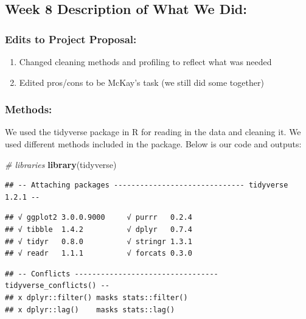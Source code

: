 \documentclass[]{article}
\newenvironment{Shaded}{\begin{snugshade}}{\end{snugshade}}
\newcommand{\CommentTok}[1]{\textcolor[rgb]{0.56,0.35,0.01}{\textit{#1}}}
\newcommand{\KeywordTok}[1]{\textcolor[rgb]{0.13,0.29,0.53}{\textbf{#1}}}
\newcommand{\NormalTok}[1]{#1}
\providecommand{\tightlist}{%
  \setlength{\itemsep}{0pt}\setlength{\parskip}{0pt}}
\begin{document}
\hypertarget{week-8-description-of-what-we-did}{%
\subsection{Week 8 Description of What We
Did:}\label{week-8-description-of-what-we-did}}

\hypertarget{edits-to-project-proposal}{%
\subsubsection{Edits to Project
Proposal:}\label{edits-to-project-proposal}}

\begin{enumerate}
\def\labelenumi{\arabic{enumi}.}
\tightlist
\item
  Changed cleaning methods and profiling to reflect what was needed
\item
  Edited pros/cons to be McKay's task (we still did some together)
\end{enumerate}

\hypertarget{methods}{%
\subsubsection{Methods:}\label{methods}}

We used the tidyverse package in R for reading in the data and cleaning
it. We used different methods included in the package. Below is our code
and outputs:

\begin{Shaded}
\begin{Highlighting}[]
\CommentTok{# libraries}
\KeywordTok{library}\NormalTok{(tidyverse)}
\end{Highlighting}
\end{Shaded}

\begin{verbatim}
## -- Attaching packages ------------------------------ tidyverse 1.2.1 --
\end{verbatim}

\begin{verbatim}
## √ ggplot2 3.0.0.9000     √ purrr   0.2.4     
## √ tibble  1.4.2          √ dplyr   0.7.4     
## √ tidyr   0.8.0          √ stringr 1.3.1     
## √ readr   1.1.1          √ forcats 0.3.0
\end{verbatim}

\begin{verbatim}
## -- Conflicts --------------------------------- tidyverse_conflicts() --
## x dplyr::filter() masks stats::filter()
## x dplyr::lag()    masks stats::lag()
\end{verbatim}
\end{document}
